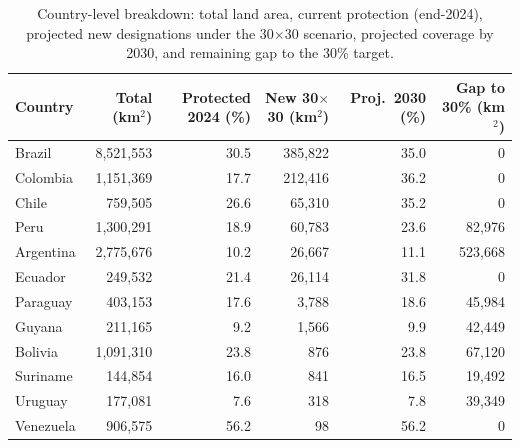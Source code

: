 \begin{table}[htbp]
  \centering
  \small
  \caption{Country-level breakdown: total land area, current protection (end-2024), projected new designations under the 30$\times$30 scenario, projected coverage by 2030, and remaining gap to the 30\% target.}
  \label{tab:forward_country}
  \begin{tabular}{lrrrrr}
    \toprule
    Country & Total (km$^2$) & Protected 2024 (\%) & New 30$\times$30 (km$^2$) & Proj.\ 2030 (\%) & Gap to 30\% (km$^2$) \\
    \midrule
    Brazil & 8,521,553 & 30.5 & 385,822 & 35.0 & 0 \\
    Colombia & 1,151,369 & 17.7 & 212,416 & 36.2 & 0 \\
    Chile & 759,505 & 26.6 & 65,310 & 35.2 & 0 \\
    Peru & 1,300,291 & 18.9 & 60,783 & 23.6 & 82,976 \\
    Argentina & 2,775,676 & 10.2 & 26,667 & 11.1 & 523,668 \\
    Ecuador & 249,532 & 21.4 & 26,114 & 31.8 & 0 \\
    Paraguay & 403,153 & 17.6 & 3,788 & 18.6 & 45,984 \\
    Guyana & 211,165 & 9.2 & 1,566 & 9.9 & 42,449 \\
    Bolivia & 1,091,310 & 23.8 & 876 & 23.8 & 67,120 \\
    Suriname & 144,854 & 16.0 & 841 & 16.5 & 19,492 \\
    Uruguay & 177,081 & 7.6 & 318 & 7.8 & 39,349 \\
    Venezuela & 906,575 & 56.2 & 98 & 56.2 & 0 \\
    \bottomrule
  \end{tabular}
\end{table}

